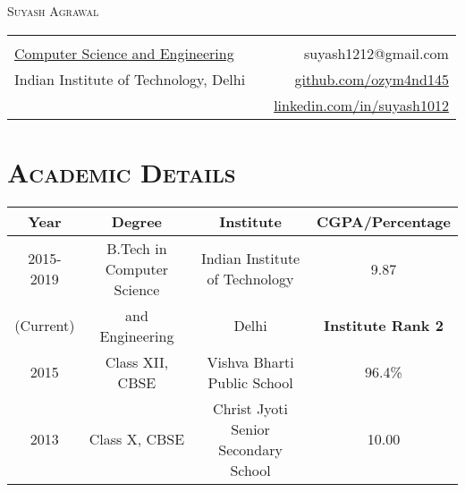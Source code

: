 \documentclass{article}
\newcommand{\tmpsection}[1]{}
\let\tmpsection=\section
\renewcommand{\section}[1]{\tmpsection*{\textsc{#1}}}
\begin{document}

\begin{center}
 {\Large \textsc{Suyash Agrawal} }\\ 
\begin{tabular}{ l p{8cm} r }
    & &   \\
  \href{http://www.cse.iitd.ernet.in/}{Computer Science and Engineering} & & suyash1212@gmail.com \\
  Indian Institute of Technology, Delhi
  & & \href{https://github.com/ozym4nd145/}{github.com/ozym4nd145} \\
  & & \href{https://www.linkedin.com/in/suyash1012}{linkedin.com/in/suyash1012}\\
\end{tabular}
\end{center}


\section{Academic Details}

\begin{center}
\begin{tabular}{ |c | c | c | c |}
\hline
Year & Degree & Institute & CGPA/Percentage \\ 
\hline
2015-2019 & B.Tech in Computer Science & Indian Institute of Technology & 9.87 \\ 
(Current) & and Engineering & Delhi & \textbf{Institute Rank 2}\\
\hline


2015 & Class XII, CBSE & Vishva Bharti Public School & 96.4\% \\ 

\hline
2013 & Class X, CBSE & Christ Jyoti Senior Secondary School & 10.00 \\  \hline
\end{tabular}
\end{center}
\end{document}
